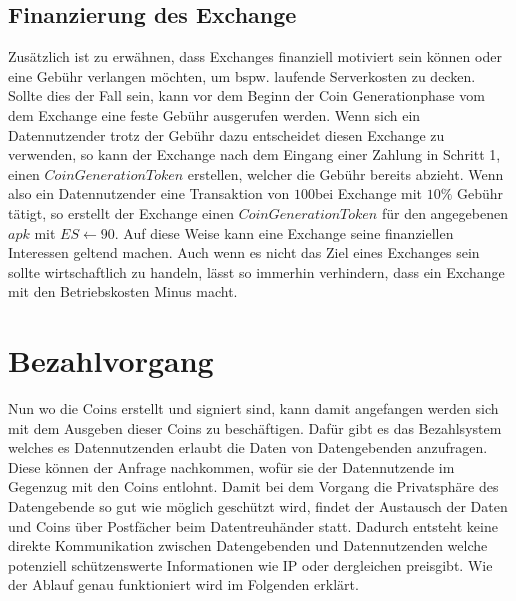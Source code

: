 \documentclass[11pt,a4paper]{scrreprt}
\begin{document}
\subsection{Finanzierung des Exchange}
Zusätzlich ist zu erwähnen, dass Exchanges finanziell motiviert sein können oder eine Gebühr verlangen möchten, um bspw. laufende Serverkosten zu decken. Sollte dies der Fall sein, kann vor dem Beginn der Coin Generationphase vom dem Exchange eine feste Gebühr ausgerufen werden. Wenn sich ein Datennutzender trotz der Gebühr dazu entscheidet diesen Exchange zu verwenden, so kann der Exchange nach dem Eingang einer Zahlung in Schritt 1, einen $CoinGenerationToken$ erstellen, welcher die Gebühr bereits abzieht. Wenn also ein Datennutzender eine Transaktion von $100$\texteuro  bei Exchange mit $10\%$ Gebühr tätigt, so erstellt der Exchange einen $CoinGenerationToken$ für den angegebenen $apk$ mit $ES \leftarrow 90$\texteuro. Auf diese Weise kann eine Exchange seine finanziellen Interessen geltend machen. Auch wenn es nicht das Ziel eines Exchanges sein sollte wirtschaftlich zu handeln, lässt so immerhin verhindern, dass ein Exchange mit den Betriebskosten Minus macht.

\section{Bezahlvorgang}
\label{system:payment}
Nun wo die Coins erstellt und signiert sind, kann damit angefangen werden sich mit dem Ausgeben dieser Coins zu beschäftigen. Dafür gibt es das Bezahlsystem welches es Datennutzenden erlaubt die Daten von Datengebenden anzufragen. Diese können der Anfrage nachkommen, wofür sie der Datennutzende im Gegenzug mit den Coins entlohnt. Damit bei dem Vorgang die Privatsphäre des Datengebende so gut wie möglich geschützt wird, findet der Austausch der Daten und Coins über Postfächer beim Datentreuhänder statt. Dadurch entsteht keine direkte Kommunikation zwischen Datengebenden und Datennutzenden welche potenziell schützenswerte Informationen wie IP oder dergleichen preisgibt. Wie der Ablauf genau funktioniert wird im Folgenden erklärt.
\end{document}
